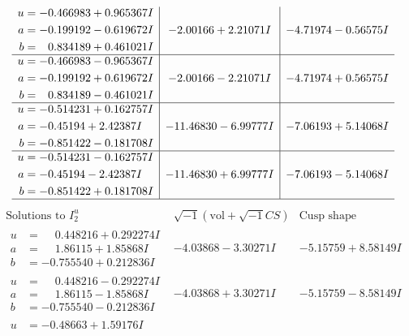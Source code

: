 \documentclass[1p]{elsarticle_modified}
\theoremstyle{definition}
\newcommand{\I}{\sqrt{-1}}
\begin{document}
$$\begin{array}{c|c|c}
\begin{aligned}
u &= -0.466983 + 0.965367 I \\
a &= -0.199192 - 0.619672 I \\
b &= \phantom{-}0.834189 + 0.461021 I\end{aligned}
 & -2.00166 + 2.21071 I & -4.71974 - 0.56575 I \\ \hline\begin{aligned}
u &= -0.466983 - 0.965367 I \\
a &= -0.199192 + 0.619672 I \\
b &= \phantom{-}0.834189 - 0.461021 I\end{aligned}
 & -2.00166 - 2.21071 I & -4.71974 + 0.56575 I \\ \hline\begin{aligned}
u &= -0.514231 + 0.162757 I \\
a &= -0.45194 + 2.42387 I \\
b &= -0.851422 - 0.181708 I\end{aligned}
 & -11.46830 - 6.99777 I & -7.06193 + 5.14068 I \\ \hline\begin{aligned}
u &= -0.514231 - 0.162757 I \\
a &= -0.45194 - 2.42387 I \\
b &= -0.851422 + 0.181708 I\end{aligned}
 & -11.46830 + 6.99777 I & -7.06193 - 5.14068 I\\
 \hline 
 \end{array}$$\newpage$$\begin{array}{c|c|c}  
\text{Solutions to }I^u_{2}& \I (\text{vol} + \sqrt{-1}CS) & \text{Cusp shape}\\
 \hline 
\begin{aligned}
u &= \phantom{-}0.448216 + 0.292274 I \\
a &= \phantom{-}1.86115 + 1.85868 I \\
b &= -0.755540 + 0.212836 I\end{aligned}
 & -4.03868 - 3.30271 I & -5.15759 + 8.58149 I \\ \hline\begin{aligned}
u &= \phantom{-}0.448216 - 0.292274 I \\
a &= \phantom{-}1.86115 - 1.85868 I \\
b &= -0.755540 - 0.212836 I\end{aligned}
 & -4.03868 + 3.30271 I & -5.15759 - 8.58149 I \\ \hline\begin{aligned}
u &= -0.48663 + 1.59176 I \\

\end{aligned}
\end{array}$$
\end{document}
